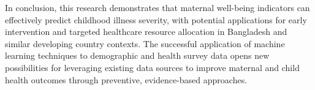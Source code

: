 \documentclass[12pt]{report}
\begin{document}
In conclusion, this research demonstrates that maternal well-being indicators can effectively predict childhood illness severity, with potential applications for early intervention and targeted healthcare resource allocation in Bangladesh and similar developing country contexts. The successful application of machine learning techniques to demographic and health survey data opens new possibilities for leveraging existing data sources to improve maternal and child health outcomes through preventive, evidence-based approaches.

\begingroup
\let\clearpage\relax
\renewcommand{\bibname}{References}
\printbibliography
\endgroup
\end{document}
